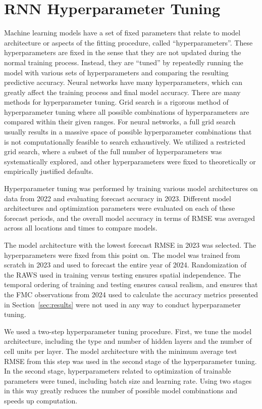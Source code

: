 \documentclass[fire,article,submit,pdftex,moreauthors]{Definitions/mdpi}
\begin{document}
\section[\appendixname~\thesection]{RNN Hyperparameter Tuning}
\label{sec:appendix_hyper}

Machine learning models have a set of fixed parameters that relate to model architecture or aspects of the fitting procedure, called ``hyperparameters''. These hyperparameters are fixed in the sense that they are not updated during the normal training process. Instead, they are ``tuned'' by repeatedly running the model with various sets of hyperparameters and comparing the resulting predictive accuracy. Neural networks have many hyperparameters, which can greatly affect the training process and final model accuracy. There are many methods for hyperparameter tuning. Grid search is a rigorous method of hyperparameter tuning where all possible combinations of hyperparameters are compared within their given ranges. For neural networks, a full grid search usually results in a massive space of possible hyperparameter combinations that is not computationally feasible to search exhaustively. We utilized a restricted grid search, where a subset of the full number of hyperparameters was systematically explored, and other hyperparameters were fixed to theoretically or empirically justified defaults. 

Hyperparameter tuning was performed by training various model architectures on data from 2022 and evaluating forecast accuracy in 2023. Different model architectures and optimization parameters were evaluated on each of these forecast periods, and the overall model accuracy in terms of RMSE was averaged across all locations and times to compare models. 

The model architecture with the lowest forecast RMSE in 2023 was selected. The hyperparameters were fixed from this point on. The model was trained from scratch in 2023 and used to forecast the entire year of 2024. Randomization of the RAWS used in training versus testing ensures spatial independence. The temporal ordering of training and testing ensures causal realism, and ensures that the FMC observations from 2024 used to calculate the accuracy metrics presented in Section~\ref{sec:results} were not used in any way to conduct hyperparameter tuning.

We used a two-step hyperparameter tuning procedure. First, we tune the model architecture, including the type and number of hidden layers and the number of cell units per layer. The model architecture with the minimum average test RMSE from this step was used in the second stage of the hyperparameter tuning. In the second stage, hyperparameters related to optimization of trainable parameters were tuned, including batch size and learning rate. Using two stages in this way greatly reduces the number of possible model combinations and speeds up computation. 
\end{document}
